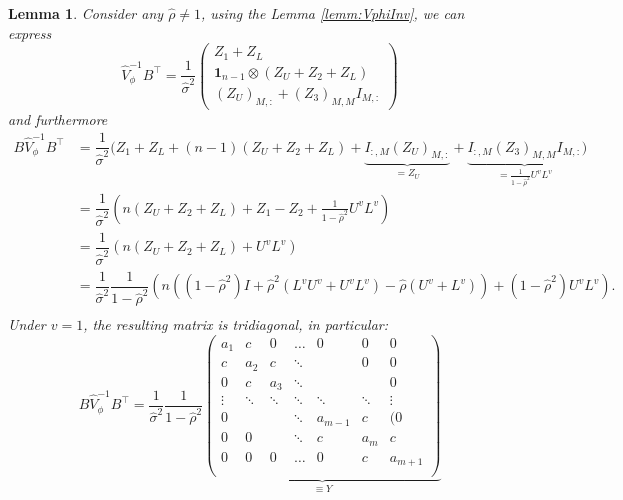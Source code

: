 \documentclass[11pt,dvipsnames]{article}
\newtheorem{lemma}{Lemma}
\begin{document}
\begin{appendices}
\begin{lemma}
Consider any $ \hat{\rho}\neq 1 $, using the Lemma \ref{lemm:VphiInv}, we can express
\begin{equation}
\widehat{V}_{\phi}^{-1}B^{\top}=\dfrac{1}{\hat{\sigma}^{2}}
\begin{pmatrix}
Z_{1}+Z_{L}\\
\mathbf{1}_{n-1} \otimes (Z_{U}+Z_{2}+Z_{L})\\
\left( Z_{U}\right)_{M,:}+\left( Z_{3}\right)_{M,M}I_{M,:}
\end{pmatrix}
\end{equation}
and furthermore
\begin{equation}
\begin{split}
B\widehat{V}_{\phi}^{-1}B^{\top}
&=\dfrac{1}{\hat{\sigma}^{2}}\big( Z_{1}+Z_{L}+(n-1)\left( Z_{U}+Z_{2}+Z_{L}\right) + \underbrace{I_{:,M}\left( Z_{U}\right)_{M,:}}_{=Z_{U}}+\underbrace{I_{:,M}\left( Z_{3}\right)_{M,M}I_{M,:}}_{=\frac{1}{1-\hat{\rho}^{2}}U^{v}L^{v}}\big) \\
&=\dfrac{1}{\hat{\sigma}^{2}}\left(n\left( Z_{U}+Z_{2}+Z_{L}\right) + Z_{1} - Z_{2} + \frac{1}{1-\hat{\rho}^{2}}U^{v}L^{v}\right) \\
&=\dfrac{1}{\hat{\sigma}^{2}}\left(n\left( Z_{U}+Z_{2}+Z_{L}\right) + U^{v}L^{v}\right) \\
&=\dfrac{1}{\hat{\sigma}^{2}}\dfrac{1}{1-\hat{\rho}^{2}}\left(n\left( (1-\hat{\rho}^{2}) I + \hat{\rho}^{2} (L^{v}U^{v}+U^{v}L^{v})  - \hat{\rho}(U^{v}+L^{v})\right) + (1-\hat{\rho}^{2})U^{v}L^{v}\right). \\
\end{split}
\end{equation}
Under $ v=1 $, the resulting matrix is tridiagonal, in particular:
\begin{equation}
B\widehat{V}_{\phi}^{-1}B^{\top}=\dfrac{1}{\hat{\sigma}^{2}}\dfrac{1}{1-\hat{\rho}^{2}}
\underbrace{
\begin{pmatrix}
a_{1}  & c & 0 & \dots & 0 & 0 & 0\\
c &  a_{2} & c & \ddots & & 0& 0\\
0  & c  & a_{3} & \ddots &  &  & 0\\
\vdots & \ddots  & \ddots  & \ddots & \ddots & \ddots & \vdots\\
0 &   &   & \ddots & a_{m-1} & c & (0\\
0  & 0 &   & \ddots & c  & a_{m} & c\\
0  & 0 & 0 & \dots & 0 & c  & a_{m+1} \\
\end{pmatrix}
}_{\equiv Y}
\end{equation}

\end{lemma}
\end{appendices}
\end{document}
